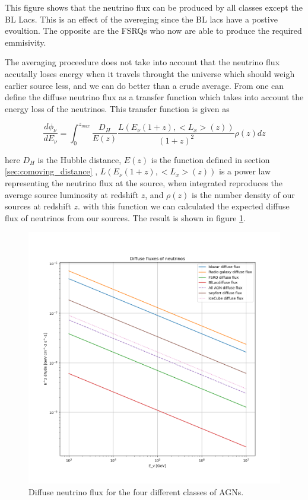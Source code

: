 \documentclass{article}
\begin{document}
This figure shows that the neutrino flux can be produced by all classes except 
the BL Lacs. This is an effect of the avereging since the BL lacs have a postive evoultion.
 The opposite are the FSRQs who now are able to produce the required emmisivity.

The averaging proceedure does not take into account that the neutrino flux accutally loses energy when it travels throught the universe which should weigh earlier source less, and we can do better than a crude average. 
From \cite{Palladino_2020} one can define the diffuse neutrino flux as a transfer function which takes into account the energy loss of the neutrinos. This transfer function is given as

\begin{equation}
    \frac{d\phi_\nu}{dE_\nu} = \int_0^{z_{max}} \frac{D_H}{E(z)} \frac{L(E_\nu (1+z),<L_x>(z))}{(1+z)^2} \rho(z) dz
\end{equation}

here $D_H$ is the Hubble distance, $E(z)$ is the function defined in section \ref{sec:comoving_distance} , $L(E_\nu (1+z), <L_x>(z))$ is a power law representing the neutrino flux at the source, when integrated reproduces the average source luminosity at redshift $z$, and $\rho(z)$ is the number density of our sources at redshift $z$.
with this function we can calculated the expected diffuse flux of neutrinos from our sources. The result is shown in figure \ref{fig:neutrino_diffuse}.
\begin{figure}[H]
    \centering
    \includegraphics[width = \textwidth]{new_plots/diffuse_fluxes_neutrino_no_cutoff.png}
    \caption{Diffuse neutrino flux for the four different classes of AGNs.}
    \label{fig:neutrino_diffuse}
\end{figure}
\end{document}
